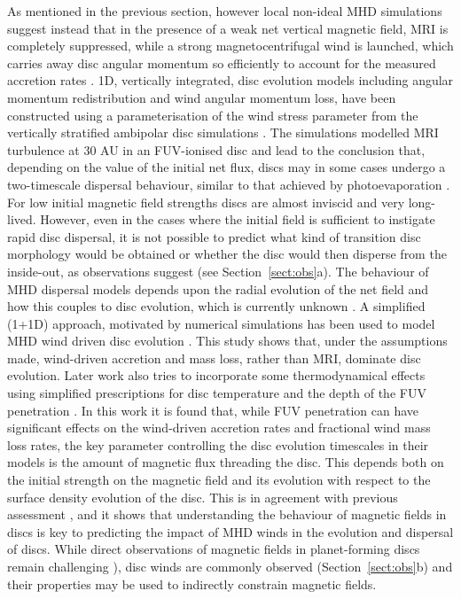 \documentclass{rsos}
\begin{document}
As mentioned in the previous section, however local non-ideal MHD simulations suggest  instead that in the presence of a weak net vertical magnetic field, MRI is completely suppressed, while a strong magnetocentrifugal wind is launched, which carries away disc angular momentum so efficiently to account for the measured accretion rates \cite{2013ApJ...769...76B}. 
1D, vertically integrated, disc evolution models including angular momentum redistribution and wind angular momentum loss, have been constructed using a parameterisation of the wind stress parameter from the vertically stratified ambipolar disc simulations \cite{2013ApJ...775...73S, 2013ApJ...778L..14A}. The simulations modelled MRI turbulence at 30 AU in an FUV-ionised disc and lead to the conclusion that, depending on the value of the initial net flux, discs may in some cases undergo a two-timescale dispersal behaviour, similar to that achieved by photoevaporation  \cite{2013ApJ...778L..14A}. For low initial magnetic field strengths discs are almost inviscid and very long-lived. However, even in the cases where the initial field is sufficient to instigate rapid disc dispersal, it is not possible to predict what kind of transition disc morphology would be obtained or whether the disc would then disperse from the inside-out, as observations suggest (see Section~\ref{sect:obs}a). The behaviour of MHD dispersal models depends upon the radial evolution of the net field and how this couples to disc evolution, which is currently unknown \cite{2013ApJ...778L..14A}.
A simplified (1+1D) approach, motivated by numerical simulations \cite{2013ApJ...769...76B} has been used to model MHD wind driven disc evolution \cite{2016arXiv161203912B, 2016ApJ...821...80B}. This study shows that, under the assumptions made, wind-driven accretion and mass loss, rather than MRI, dominate disc evolution. Later work also tries to incorporate some thermodynamical effects using simplified prescriptions for disc temperature and the depth of the FUV penetration \cite {2016ApJ...821...80B}. In this work it is found that, while FUV penetration can have significant effects on the wind-driven accretion rates and fractional wind mass loss rates, the key parameter controlling the disc evolution timescales in their models is the amount of magnetic flux threading the disc. This depends both on the initial strength on the magnetic field and its evolution with respect to the surface density evolution of the disc. This is in agreement with previous assessment \cite{2013ApJ...778L..14A}, and it shows that understanding the behaviour of magnetic fields in discs is key to predicting the impact of MHD winds in the evolution and dispersal of discs. While direct observations of magnetic fields in planet-forming discs remain challenging 
\cite{2014Natur.514..597S, 2015ApJ...809...78K}), disc winds are commonly observed (Section~\ref{sect:obs}b) and their properties may be used to indirectly constrain magnetic fields.
\end{document}
